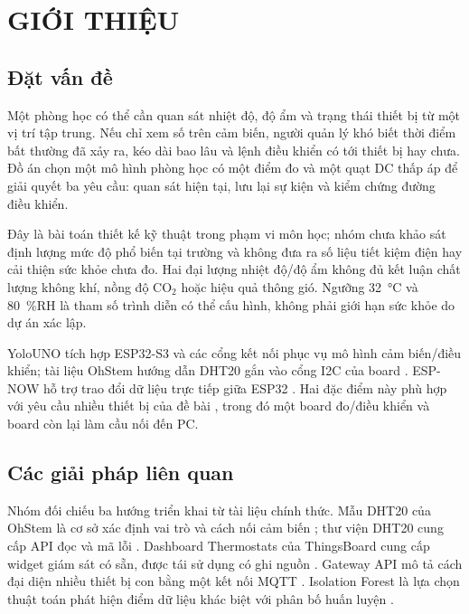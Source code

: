 \chapter{GIỚI THIỆU}
\section{Đặt vấn đề}
Một phòng học có thể cần quan sát nhiệt độ, độ ẩm và trạng thái thiết bị từ một vị trí tập trung. Nếu chỉ xem số trên cảm biến, người quản lý khó biết thời điểm bất thường đã xảy ra, kéo dài bao lâu và lệnh điều khiển có tới thiết bị hay chưa. Đồ án chọn một mô hình phòng học có một điểm đo và một quạt DC thấp áp để giải quyết ba yêu cầu: quan sát hiện tại, lưu lại sự kiện và kiểm chứng đường điều khiển.

Đây là bài toán thiết kế kỹ thuật trong phạm vi môn học; nhóm chưa khảo sát định lượng mức độ phổ biến tại trường và không đưa ra số liệu tiết kiệm điện hay cải thiện sức khỏe chưa đo. Hai đại lượng nhiệt độ/độ ẩm không đủ kết luận chất lượng không khí, nồng độ CO$_2$ hoặc hiệu quả thông gió. Ngưỡng 32~°C và 80~\%RH là tham số trình diễn có thể cấu hình, không phải giới hạn sức khỏe do dự án xác lập.

YoloUNO tích hợp ESP32-S3 và các cổng kết nối phục vụ mô hình cảm biến/điều khiển; tài liệu OhStem hướng dẫn DHT20 gắn vào cổng I2C của board \cite{ohstem}. ESP-NOW hỗ trợ trao đổi dữ liệu trực tiếp giữa ESP32 \cite{espnow}. Hai đặc điểm này phù hợp với yêu cầu nhiều thiết bị của đề bài \cite{assignment}, trong đó một board đo/điều khiển và board còn lại làm cầu nối đến PC.

\section{Các giải pháp liên quan}
Nhóm đối chiếu ba hướng triển khai từ tài liệu chính thức. Mẫu DHT20 của OhStem là cơ sở xác định vai trò và cách nối cảm biến \cite{ohstem}; thư viện DHT20 cung cấp API đọc và mã lỗi \cite{dht20}. Dashboard Thermostats của ThingsBoard cung cấp widget giám sát có sẵn, được tái sử dụng có ghi nguồn \cite{tbtemplate}. Gateway API mô tả cách đại diện nhiều thiết bị con bằng một kết nối MQTT \cite{gatewayapi}. Isolation Forest là lựa chọn thuật toán phát hiện điểm dữ liệu khác biệt với phân bố huấn luyện \cite{isolation}.

